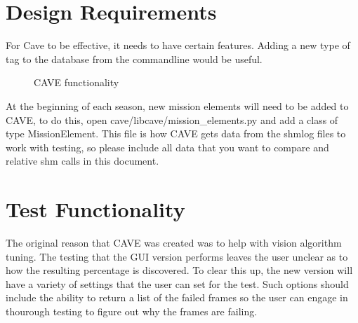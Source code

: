 \part{Design Requirements}
For Cave to be effective, it needs to have certain features.  Adding a new type of tag to the database from the commandline would be useful.
\begin{figure}
\centering
{}
\caption{CAVE functionality}
\label{fig:my_label}
\end{figure}
At the beginning of each season, new mission elements will need to be added to CAVE, to do this, open cave/libcave/mission\_elements.py and add a class of type MissionElement.  This file is how CAVE gets data from the shmlog files to work with testing, so please include all data that you want to compare and relative shm calls in this document.
\part{Test Functionality}
The original reason that CAVE was created was to help with vision algorithm tuning.  The testing that the GUI version performs leaves the user unclear as to how the resulting percentage is discovered.  To clear this up, the new version will have a variety of settings that the user can set for the test.  Such options should include the ability to return a list of the failed frames so the user can engage in thourough testing to figure out why the frames are failing.
